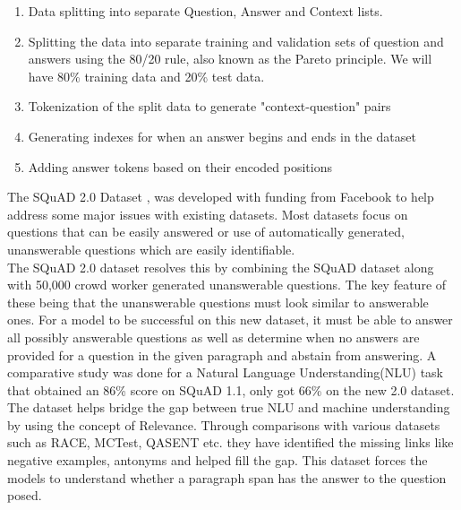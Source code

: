 \documentclass[a4paper,12pt]{report}
\begin{document}
	    \begin{enumerate}
	    	\item Data splitting into separate Question, Answer and Context lists.
	    	\item Splitting the data into separate training and validation sets of  question and answers using the 80/20 rule, also known as the Pareto principle. We will have 80\% training data and 20\% test data.
	    	\item Tokenization of the split data to generate "context-question" pairs
	    	\item Generating indexes for when an answer begins and ends in the dataset
	    	\item Adding answer tokens based on their encoded positions
	    \end{enumerate}

        The SQuAD 2.0 Dataset \citep{dataset}, was developed with funding from Facebook to help address some major issues with existing datasets. Most datasets focus on questions that can be easily answered or use of    automatically generated, unanswerable questions which are easily identifiable.\\
        The SQuAD 2.0 dataset resolves this by combining the SQuAD dataset along with 50,000 crowd worker generated unanswerable questions. The key feature of these being that the unanswerable questions must look similar to answerable ones. For a model to be successful on this new dataset, it must be able to answer all possibly answerable questions as well as determine when no answers are provided for a question in the given paragraph and abstain from answering. A comparative study was done for a Natural Language Understanding(NLU) task that obtained an 86\% score on SQuAD 1.1, only got 66\% on the new 2.0 dataset.
        The dataset helps bridge the gap between true NLU and machine understanding by using the concept of Relevance. Through comparisons with various datasets such as RACE, MCTest, QASENT etc. they have identified the missing links like negative examples, antonyms and helped fill the gap. This dataset forces the models to understand whether a paragraph span has the answer to the question posed.
\end{document}
